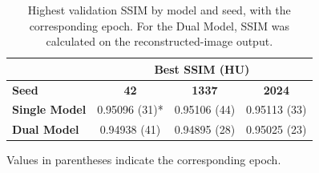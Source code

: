 \begin{table}[!htbp]
\centering

\begin{tabular}{lccc}
\hline
 & \multicolumn{3}{c}{\textbf{Best SSIM (HU)}} \\
\hline
\textbf{Seed} & \textbf{42} & \textbf{1337} & \textbf{2024} \\
\hline
\textbf{Single Model} & 0.95096 (31)* & 0.95106 (44) & 0.95113 (33) \\
\textbf{Dual Model} & 0.94938 (41) & 0.94895 (28) & 0.95025 (23) \\
\hline
\end{tabular}
\par\smallskip
\footnotesize *Values in parentheses indicate the corresponding epoch.
\captionsetup{skip=2pt}
\caption[Best validation SSIM by model and seed]{Highest validation SSIM by model and seed, with the corresponding epoch. For the Dual Model, SSIM was calculated on the reconstructed-image output.}
\label{tab:best-validation-ssim}
\end{table}
